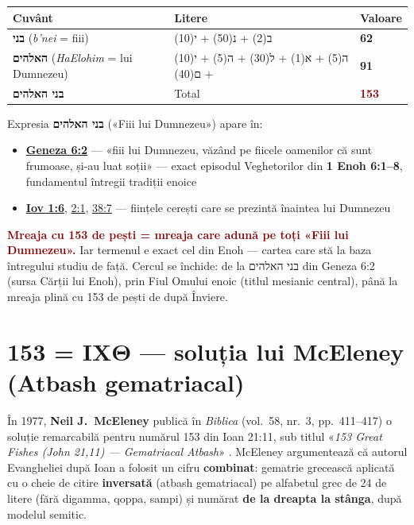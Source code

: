 \documentclass[12pt,a4paper,twoside,openany]{book}
\begin{document}
\begin{center}
\small
\begin{tabular}{L{5.6cm}L{7.9cm}L{1.3cm}}
\toprule
{}
\textbf{Cuvânt} & \textbf{Litere} & \textbf{Valoare} \\
\midrule
\textbf{בני} (\textit{b'nei} = fiii) & ב(2) + נ(50) + י(10) & \textbf{62} \\
\textbf{האלהים} (\textit{HaElohim} = lui Dumnezeu) & ה(5) + א(1) + ל(30) + ה(5) + י(10) + ם(40) & \textbf{91} \\
\textbf{בני האלהים} & Total & \textcolor{darkred}{\textbf{153}} \\
\bottomrule
\end{tabular}
\end{center}
\normalsize
Expresia \textbf{בני האלהים} («Fiii lui Dumnezeu») apare în:

\begin{itemize}
  \item \href{https://bibliaortodoxa.ro/carte.php?id=25\&cap=6\#2}{\textbf{Geneza 6:2}} — «fiii lui Dumnezeu, văzând pe fiicele oamenilor că sunt frumoase, și-au luat soții» — exact episodul Veghetorilor din \textbf{1 Enoh 6:1–8}, fundamentul întregii tradiții enoice
  \item \href{https://bibliaortodoxa.ro/carte.php?id=42\&cap=1\#6}{\textbf{Iov 1:6}}, \href{https://bibliaortodoxa.ro/carte.php?id=42\&cap=2\#1}{2:1}, \href{https://bibliaortodoxa.ro/carte.php?id=42\&cap=38\#7}{38:7} — ființele cerești care se prezintă înaintea lui Dumnezeu
\end{itemize}
\textcolor{darkred}{\textbf{Mreaja cu 153 de pești = mreaja care adună pe toți «Fiii lui Dumnezeu».}} Iar termenul e exact cel din Enoh — cartea care stă la baza întregului studiu de față. Cercul se închide: de la בני האלהים din Geneza 6:2 (sursa Cărții lui Enoh), prin Fiul Omului enoic (titlul mesianic central), până la mreaja plină cu 153 de pești de după Înviere.

\section{153 = ΙΧΘ — soluția lui McEleney (Atbash gematriacal)}

În 1977, \textbf{Neil J.~McEleney} publică în \textit{Biblica} (vol.~58, nr.~3, pp.~411--417) o soluție remarcabilă pentru numărul 153 din Ioan 21:11, sub titlul «\textit{153 Great Fishes (John 21,11) --- Gematriacal Atbash}» \parencite{mceleney1977}. McEleney argumentează că autorul Evangheliei după Ioan a folosit un cifru \textbf{combinat}: gematrie grecească aplicată cu o cheie de citire \textbf{inversată} (atbash gematriacal) pe alfabetul grec de 24 de litere (fără digamma, qoppa, sampi) și numărat \textbf{de la dreapta la stânga}, după modelul semitic.
\end{document}
